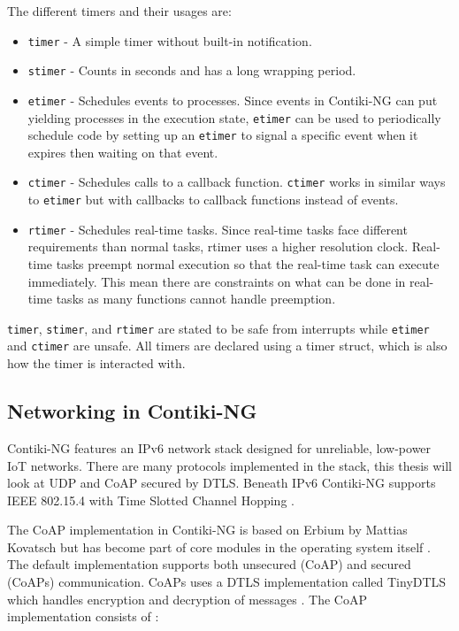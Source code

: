 \documentclass[0-thesis.tex]{subfiles}
\begin{document}
The different timers and their usages are:
\begin{itemize}
    \item \texttt{timer} - A simple timer without built-in notification.
    \item \texttt{stimer} - Counts in seconds and has a long wrapping period.
    \item \texttt{etimer} - Schedules events to processes. Since events in Contiki-NG
            can put yielding processes in the execution state, \texttt{etimer} can be
            used to periodically schedule code by setting up an \texttt{etimer} to
            signal a specific event when it expires then waiting on that event.
    \item \texttt{ctimer} - Schedules calls to a callback function. \texttt{ctimer}
            works in similar ways to \texttt{etimer} but with callbacks to callback
            functions instead of events.
    \item \texttt{rtimer} - Schedules real-time tasks. Since real-time tasks face
            different requirements than normal tasks, rtimer uses a higher resolution
            clock. Real-time tasks preempt normal execution so that the real-time task can
            execute immediately. This mean there are constraints on what can be done in
            real-time tasks as many functions cannot handle preemption.
\end{itemize}

\texttt{timer}, \texttt{stimer}, and \texttt{rtimer} are stated to be safe from interrupts
while \texttt{etimer} and \texttt{ctimer} are unsafe. All timers are declared using a
timer struct, which is also how the timer is interacted with.

\subsection{Networking in Contiki-NG}
\label{ssec:networking-contiki}
Contiki-NG features an IPv6 network stack designed for unreliable, low-power IoT networks.
There are many protocols implemented in the stack, this thesis will look at UDP and CoAP
secured by DTLS. Beneath IPv6 Contiki-NG supports IEEE 802.15.4 with Time Slotted Channel
Hopping \parencite{ieee-802.15.4}.

The CoAP implementation in Contiki-NG is based on Erbium by Mattias Kovatsch but has
become part of core modules in the operating system itself \parencite{low-power-coap}. The
default implementation supports both unsecured (CoAP) and secured (CoAPs) communication.
CoAPs uses a DTLS implementation called TinyDTLS which handles encryption and decryption
of messages \parencite{tinydtls-github}. The CoAP implementation consists of
\parencite{contiki-coap}: 
\end{document}
